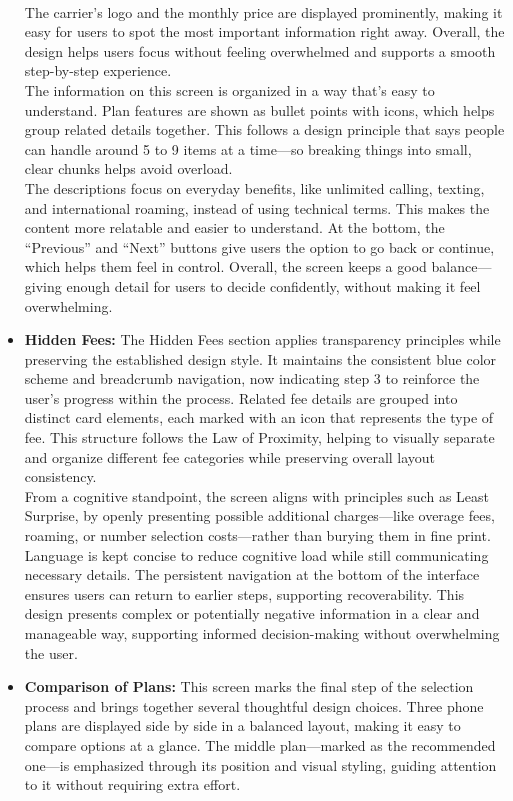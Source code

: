 \documentclass[conference]{IEEEtran}
\begin{document}
\begin{itemize}
\\
The carrier’s logo and the monthly price are displayed prominently, making it easy for users to spot the most important information right away. Overall, the design helps users focus without feeling overwhelmed and supports a smooth step-by-step experience.
\\
The information on this screen is organized in a way that’s easy to understand. Plan features are shown as bullet points with icons, which helps group related details together. This follows a design principle that says people can handle around 5 to 9 items at a time—so breaking things into small, clear chunks helps avoid overload.
\\
The descriptions focus on everyday benefits, like unlimited calling, texting, and international roaming, instead of using technical terms. This makes the content more relatable and easier to understand. At the bottom, the “Previous” and “Next” buttons give users the option to go back or continue, which helps them feel in control. Overall, the screen keeps a good balance—giving enough detail for users to decide confidently, without making it feel overwhelming.
\item \textbf{Hidden Fees:} The Hidden Fees section applies transparency principles while preserving the established design style. It maintains the consistent blue color scheme and breadcrumb navigation, now indicating step 3 to reinforce the user’s progress within the process. Related fee details are grouped into distinct card elements, each marked with an icon that represents the type of fee. This structure follows the Law of Proximity, helping to visually separate and organize different fee categories while preserving overall layout consistency.\\
From a cognitive standpoint, the screen aligns with principles such as Least Surprise, by openly presenting possible additional charges—like overage fees, roaming, or number selection costs—rather than burying them in fine print. Language is kept concise to reduce cognitive load while still communicating necessary details. The persistent navigation at the bottom of the interface ensures users can return to earlier steps, supporting recoverability. This design presents complex or potentially negative information in a clear and manageable way, supporting informed decision-making without overwhelming the user.
\item \textbf{Comparison of Plans:} This screen marks the final step of the selection process and brings together several thoughtful design choices. Three phone plans are displayed side by side in a balanced layout, making it easy to compare options at a glance. The middle plan—marked as the recommended one—is emphasized through its position and visual styling, guiding attention to it without requiring extra effort.

\end{itemize}
\end{document}

